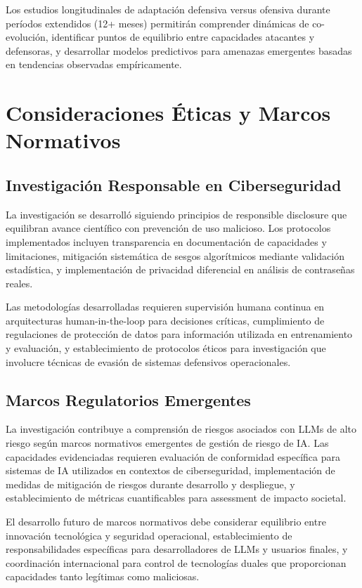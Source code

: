Los estudios longitudinales de adaptación defensiva versus ofensiva durante períodos extendidos (12+ meses) permitirán comprender dinámicas de co-evolución, identificar puntos de equilibrio entre capacidades atacantes y defensoras, y desarrollar modelos predictivos para amenazas emergentes basadas en tendencias observadas empíricamente.

\section{Consideraciones Éticas y Marcos Normativos}

\subsection{Investigación Responsable en Ciberseguridad}

La investigación se desarrolló siguiendo principios de responsible disclosure que equilibran avance científico con prevención de uso malicioso. Los protocolos implementados incluyen transparencia en documentación de capacidades y limitaciones, mitigación sistemática de sesgos algorítmicos mediante validación estadística, y implementación de privacidad diferencial en análisis de contraseñas reales.

Las metodologías desarrolladas requieren supervisión humana continua en arquitecturas human-in-the-loop para decisiones críticas, cumplimiento de regulaciones de protección de datos para información utilizada en entrenamiento y evaluación, y establecimiento de protocolos éticos para investigación que involucre técnicas de evasión de sistemas defensivos operacionales.

\subsection{Marcos Regulatorios Emergentes}

La investigación contribuye a comprensión de riesgos asociados con LLMs de alto riesgo según marcos normativos emergentes de gestión de riesgo de IA. Las capacidades evidenciadas requieren evaluación de conformidad específica para sistemas de IA utilizados en contextos de ciberseguridad, implementación de medidas de mitigación de riesgos durante desarrollo y despliegue, y establecimiento de métricas cuantificables para assessment de impacto societal.

El desarrollo futuro de marcos normativos debe considerar equilibrio entre innovación tecnológica y seguridad operacional, establecimiento de responsabilidades específicas para desarrolladores de LLMs y usuarios finales, y coordinación internacional para control de tecnologías duales que proporcionan capacidades tanto legítimas como maliciosas.

